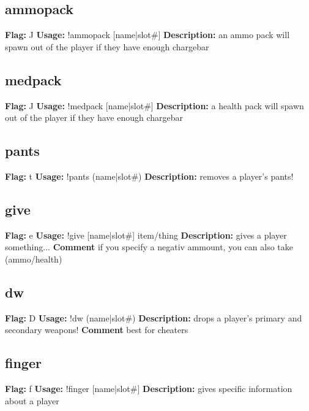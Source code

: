 \subsection{ammopack}
\textbf{Flag:} \hfill J \linebreak\textbf{Usage:} \hfill !ammopack [name|slot\#] \linebreak
\textbf{Description:} \hfill an ammo pack will spawn out of the player if they have enough chargebar

\subsection{medpack}
\textbf{Flag:} \hfill J \linebreak\textbf{Usage:} \hfill !medpack [name|slot\#] \linebreak
\textbf{Description:} \hfill a health pack will spawn out of the player if they have enough chargebar

\subsection{pants}
\textbf{Flag:} \hfill t \linebreak\textbf{Usage:} \hfill !pants (name|slot\#) \linebreak
\textbf{Description:} \hfill removes a player's pants!

\subsection{give}
\textbf{Flag:} \hfill e \linebreak\textbf{Usage:} \hfill !give [name|slot\#] item/thing \linebreak
\textbf{Description:} \hfill gives a player something...
\linebreak
\textbf{Comment} \hfill if you specify a negativ ammount, you can also take (ammo/health)

\subsection{dw}
\textbf{Flag:} \hfill D \linebreak\textbf{Usage:} \hfill !dw (name|slot\#) \linebreak
\textbf{Description:} \hfill drops a player's primary and secondary weapons!
\linebreak
\textbf{Comment} \hfill best for cheaters

\subsection{finger}
\textbf{Flag:} \hfill f \linebreak\textbf{Usage:} \hfill !finger [name|slot\#] \linebreak
\textbf{Description:} \hfill gives specific information about a player

